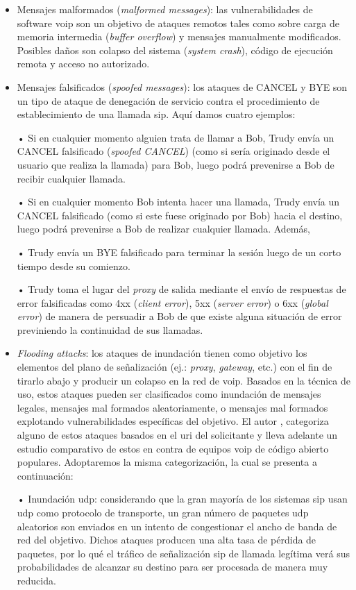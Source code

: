 \documentclass[a4paper,12pt]{report}
\begin{document}
\begin{itemize}
\item Mensajes malformados (\emph{malformed messages}):
las vulnerabilidades de software \ac{voip} son un objetivo de ataques remotos tales como
sobre carga de memoria intermedia (\emph{buffer overflow}) y mensajes
manualmente modificados. Posibles daños son colapso del sistema (\emph{system
crash}), código de ejecución remota y acceso no autorizado. 

\item Mensajes falsificados (\emph{spoofed messages}):
los ataques de CANCEL y BYE son un tipo de ataque de denegación de
servicio contra el procedimiento de establecimiento de una llamada \ac{sip}. 
Aquí damos cuatro ejemplos:

• Si en cualquier momento alguien trata de llamar a Bob, Trudy envía un CANCEL
falsificado (\emph{spoofed CANCEL}) (como si sería originado desde el usuario
que realiza la llamada) para Bob, luego podrá prevenirse a Bob de recibir
cualquier llamada.

• Si en cualquier momento Bob intenta hacer una llamada, Trudy envía un CANCEL
falsificado (como si este fuese originado por Bob) hacia el destino, luego
podrá prevenirse a Bob de realizar cualquier llamada. Además,

• Trudy envía un BYE falsificado para terminar la sesión luego de un corto
tiempo desde su comienzo. 

• Trudy toma el lugar del \emph{proxy} de salida mediante el envío de respuestas de
error falsificadas como 4xx (\emph{client error}), 5xx (\emph{server error}) o 6xx (\emph{global
error}) de manera de persuadir a Bob de que existe alguna situación de error
previniendo la continuidad de sus llamadas.  

\item \emph{Flooding attacks}:
los ataques de inundación tienen como objetivo los
elementos del plano de señalización (ej.: \emph{proxy}, \emph{gateway}, etc.) con el fin de
tirarlo abajo y producir un colapso en la red de \ac{voip}. Basados en la técnica de
uso, estos ataques pueden ser clasificados como inundación de mensajes legales,
mensajes mal formados aleatoriamente, o mensajes mal formados explotando
vulnerabilidades específicas del objetivo. 
El autor \cite{nassarm}, categoriza alguno de estos
ataques basados en el \ac{uri} del solicitante y lleva adelante un estudio
comparativo de estos en contra de equipos \ac{voip} de código abierto populares.
Adoptaremos la misma categorización, la cual se presenta a continuación:

• Inundación \ac{udp}: considerando que la gran mayoría de los sistemas \ac{sip} usan \ac{udp}
como protocolo de transporte, un gran número de paquetes \ac{udp} aleatorios son
enviados en un intento de congestionar el ancho de banda de red del objetivo.
Dichos ataques producen una alta tasa de pérdida de paquetes, por lo qué el
tráfico de señalización \ac{sip} de llamada legítima verá sus probabilidades de
alcanzar su destino para ser procesada de manera muy reducida.
 

\end{itemize}
\end{document}
